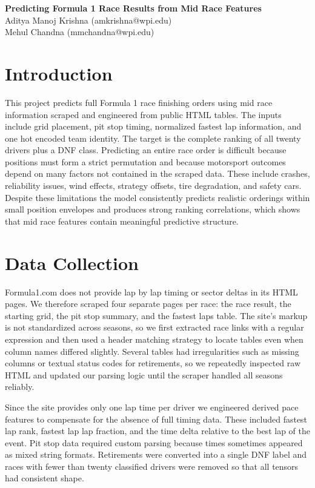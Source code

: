 \documentclass[12pt]{article}
\begin{document}
\begin{center}
    {\Large \textbf{Predicting Formula 1 Race Results from Mid Race Features}}\\[4pt]
    Aditya Manoj Krishna (amkrishna@wpi.edu) \\
    Mehul Chandna (mmchandna@wpi.edu)
\end{center}

\section{Introduction}

This project predicts full Formula 1 race finishing orders using mid race information scraped and engineered from public HTML tables. The inputs include grid placement, pit stop timing, normalized fastest lap information, and one hot encoded team identity. The target is the complete ranking of all twenty drivers plus a DNF class. Predicting an entire race order is difficult because positions must form a strict permutation and because motorsport outcomes depend on many factors not contained in the scraped data. These include crashes, reliability issues, wind effects, strategy offsets, tire degradation, and safety cars. Despite these limitations the model consistently predicts realistic orderings within small position envelopes and produces strong ranking correlations, which shows that mid race features contain meaningful predictive structure.

\section{Data Collection}

Formula1.com does not provide lap by lap timing or sector deltas in its HTML pages. We therefore scraped four separate pages per race: the race result, the starting grid, the pit stop summary, and the fastest laps table. The site’s markup is not standardized across seasons, so we first extracted race links with a regular expression and then used a header matching strategy to locate tables even when column names differed slightly. Several tables had irregularities such as missing columns or textual status codes for retirements, so we repeatedly inspected raw HTML and updated our parsing logic until the scraper handled all seasons reliably.

Since the site provides only one lap time per driver we engineered derived pace features to compensate for the absence of full timing data. These included fastest lap rank, fastest lap lap fraction, and the time delta relative to the best lap of the event. Pit stop data required custom parsing because times sometimes appeared as mixed string formats. Retirements were converted into a single DNF label and races with fewer than twenty classified drivers were removed so that all tensors had consistent shape.
\end{document}
